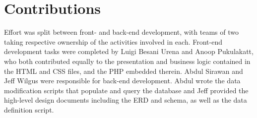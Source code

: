 \documentclass{article}
\begin{document}
    \section{Contributions}
        Effort was split between front- and back-end development, with teams of two taking respective ownership of the
        activities involved in each. Front-end development tasks were completed by Luigi Besani Urena and Anoop
        Pukulakatt, who both contributed equally to the presentation and business logic contained in the HTML and CSS
        files, and the PHP embedded therein. Abdul Sirawan and Jeff Wilgus were responsible for back-end development.
        Abdul wrote the data modification scripts that populate and query the database and Jeff provided the high-level 
        design documents including the ERD and schema, as well as the data definition script.
\end{document}
